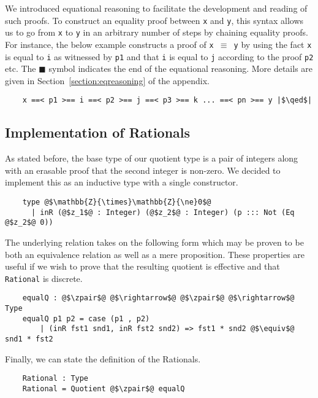 \documentclass[12pt,twoside,maitrise]{dms}
\theoremstyle{definition}
\numberwithin{equation}{section}
\numberwithin{table}{chapter}
\numberwithin{figure}{chapter}
\newcommand\id[1] {\texttt{#1}}
\newcommand\fn[1] {\texttt{#1}}
\renewcommand\qed{\blacksquare}
\begin{document}
We introduced equational reasoning to facilitate the development and reading of
such proofs. To construct an equality proof between \id{x} and \id{y}, this
syntax allows us to go from \id{x} to \id{y} in an arbitrary number of steps by
chaining equality proofs. For instance, the below example constructs a proof
of \fn{x $\equiv$ y} by using the fact \id{x} is equal to \id{i} as witnessed by
\id{p1} and that \id{i} is equal to \id{j} according to the proof \id{p2} etc.
The $\qed$ symbol indicates the end of the equational reasoning. More details
are given in Section~\ref{section:eqreasoning} of the appendix.

\begin{verbatim}
    x ==< p1 >== i ==< p2 >== j ==< p3 >== k ... ==< pn >== y |$\qed$|
\end{verbatim}

\subsection*{Implementation of Rationals}
As stated before, the base type of our quotient type is a pair of integers along
with an erasable proof that the second integer is non-zero. We decided to
implement this as an inductive type with a single constructor.

\begin{verbatim}
    type @$\mathbb{Z}{\times}\mathbb{Z}{\ne}0$@
      | inR (@$z_1$@ : Integer) (@$z_2$@ : Integer) (p ::: Not (Eq @$z_2$@ 0))
\end{verbatim}

The underlying relation takes on the following form which may be proven to be
both an equivalence relation as well as a mere proposition. These properties are
useful if we wish to prove that the resulting quotient is effective and that
\id{Rational} is discrete.

\begin{verbatim}
    equalQ : @$\zpair$@ @$\rightarrow$@ @$\zpair$@ @$\rightarrow$@ Type
    equalQ p1 p2 = case (p1 , p2)
        | (inR fst1 snd1, inR fst2 snd2) => fst1 * snd2 @$\equiv$@ snd1 * fst2
\end{verbatim}

Finally, we can state the definition of the Rationals.

\begin{verbatim}
    Rational : Type
    Rational = Quotient @$\zpair$@ equalQ
\end{verbatim}
\end{document}
